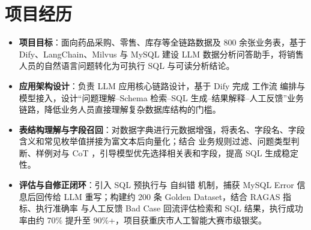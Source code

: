 \documentclass[10pt]{article}
\begin{document}
    \section[项目经历]{\makebox[\iconwidth][c]{\color{primarycolor}{\faProjectDiagram}}\quad 项目经历}
    \begin{itemize}
        \item \textbf{项目目标}：面向药品采购、零售、库存等全链路数据及 800 余张业务表，基于 Dify、LangChain、Milvus 与 MySQL 建设 LLM 数据分析问答助手，将销售人员的自然语言问题转化为可执行 SQL 与可读分析结论。
        \item \textbf{应用架构设计}：负责 LLM 应用核心链路设计，基于 Dify 完成 工作流 编排与模型接入，设计“问题理解--Schema 检索--SQL 生成--结果解释--人工反馈”业务链路，降低业务人员直接理解复杂数据库结构的门槛。
        \item \textbf{表结构理解与字段召回}：对数据字典进行元数据增强，将表名、字段名、字段含义和常见枚举值拼接为富文本后向量化；结合 业务规则过滤、问题类型判断、样例对与 CoT ，引导模型优先选择相关表和字段，提高 SQL 生成稳定性。
        \item \textbf{评估与自修正闭环}：引入 SQL 预执行与 自纠错 机制，捕获 MySQL Error 信息后回传给 LLM 重写；构建约 200 条 Golden Dataset，结合 RAGAS 指标、执行准确率 与人工反馈 Bad Case 回流评估检索和 SQL 结果，执行成功率由约 70\% 提升至 90\%+，项目获重庆市人工智能大赛市级银奖。
    \end{itemize}
\end{document}

